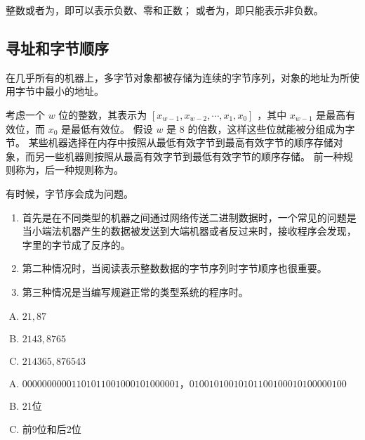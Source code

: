 {{        整数或者为，即可以表示负数、零和正数；
        或者为，即只能表示非负数。
    }

    \subsection{寻址和字节顺序}
    {
        在几乎所有的机器上，多字节对象都被存储为连续的字节序列，对象的地址为所使用字节中最小的地址。

        考虑一个 $w$ 位的整数，其表示为 $[x_{w - 1}, x_{w - 2}, \cdots, x_1, x_0]$ ，其中 $x_{w - 1}$ 是最高有效位，而 $x_0$ 是最低有效位。
        假设 $w$ 是 $8$ 的倍数，这样这些位就能被分组成为字节。
        某些机器选择在内存中按照从最低有效字节到最高有效字节的顺序存储对象，而另一些机器则按照从最高有效字节到最低有效字节的顺序存储。
        前一种规则称为，后一种规则称为。

        有时候，字节序会成为问题。

        \begin{enumerate}
            \item
            {
                首先是在不同类型的机器之间通过网络传送二进制数据时，一个常见的问题是当小端法机器产生的数据被发送到大端机器或者反过来时，接收程序会发现，字里的字节成了反序的。
            }
            \item
            {
                第二种情况时，当阅读表示整数数据的字节序列时字节顺序也很重要。
            }
            \item
            {
                第三种情况是当编写规避正常的类型系统的程序时。
            }
        \end{enumerate}

        \begin{practicec}
            \begin{enumerate}[A.]
                \item $21, 87$
                \item $2143, 8765$
                \item $214365, 876543$
            \end{enumerate}
        \end{practicec}

        \begin{practicec}
            \begin{enumerate}[A.]
                \item $0000 0000 0011 0101 1001 0001 0100 0001， 0100 1010 0101 0110 0100 0101 0000 0100$
                \item 21位
                \item 前9位和后2位
            \end{enumerate}
        \end{practicec}
    }

}

